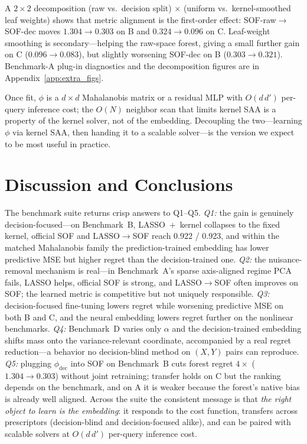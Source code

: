 \documentclass[11pt]{article}
\begin{document}
A $2\times 2$ decomposition (raw vs.\ decision split) $\times$ (uniform vs.\ kernel-smoothed leaf weights) shows that metric alignment is the first-order effect: SOF-raw$\to$SOF-dec moves $1.304\to 0.303$ on B and $0.324\to 0.096$ on C. Leaf-weight smoothing is secondary---helping the raw-space forest, giving a small further gain on C ($0.096\to 0.083$), but slightly worsening SOF-dec on B ($0.303\to 0.321$). Benchmark-A plug-in diagnostics and the decomposition figures are in Appendix~\ref{app:extra_figs}.

Once fit, $\phi$ is a $d\times d$ Mahalanobis matrix or a residual MLP with $O(d\,d')$ per-query inference cost; the $O(N)$ neighbor scan that limits kernel SAA is a property of the kernel solver, not of the embedding. Decoupling the two---learning $\phi$ via kernel SAA, then handing it to a scalable solver---is the version we expect to be most useful in practice.

\section{Discussion and Conclusions}\label{sec:conclusions}

The benchmark suite returns crisp answers to Q1--Q5. \emph{Q1:} the gain is genuinely decision-focused---on Benchmark~B, LASSO~+~kernel collapses to the fixed kernel, official SOF and LASSO$\to$SOF reach 0.922 / 0.923, and within the matched Mahalanobis family the prediction-trained embedding has lower predictive MSE but higher regret than the decision-trained one. \emph{Q2:} the nuisance-removal mechanism is real---in Benchmark~A's sparse axis-aligned regime PCA fails, LASSO helps, official SOF is strong, and LASSO$\to$SOF often improves on SOF; the learned metric is competitive but not uniquely responsible. \emph{Q3:} decision-focused fine-tuning lowers regret while worsening predictive MSE on both B and C, and the neural embedding lowers regret further on the nonlinear benchmarks. \emph{Q4:} Benchmark~D varies only $\alpha$ and the decision-trained embedding shifts mass onto the variance-relevant coordinate, accompanied by a real regret reduction---a behavior no decision-blind method on $(X,Y)$ pairs can reproduce. \emph{Q5:} plugging $\phi_{\mathrm{dec}}$ into SOF on Benchmark~B cuts forest regret $4\times$ ($1.304\to 0.303$) without joint retraining; transfer holds on C but the ranking depends on the benchmark, and on A it is weaker because the forest's native bias is already well aligned. Across the suite the consistent message is that \emph{the right object to learn is the embedding}: it responds to the cost function, transfers across prescriptors (decision-blind and decision-focused alike), and can be paired with scalable solvers at $O(d\,d')$ per-query inference cost.
\end{document}
